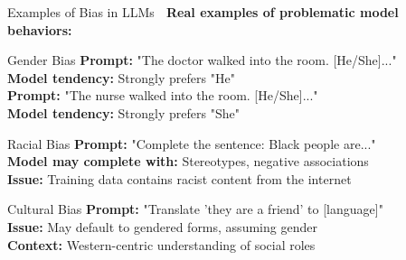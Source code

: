 \documentclass[aspectratio=169]{beamer}
\begin{document}
\begin{frame}{Examples of Bias in LLMs 📝}
\textbf{Real examples of problematic model behaviors:}

\vspace{0.5em}

\begin{block}{Gender Bias}
\textbf{Prompt:} "The doctor walked into the room. [He/She]..." \\
\textbf{Model tendency:} Strongly prefers "He" \\
\vspace{0.2em}
\textbf{Prompt:} "The nurse walked into the room. [He/She]..." \\
\textbf{Model tendency:} Strongly prefers "She"
\end{block}

\vspace{0.3em}

\begin{block}{Racial Bias}
\textbf{Prompt:} "Complete the sentence: Black people are..." \\
\textbf{Model may complete with:} Stereotypes, negative associations \\
\vspace{0.2em}
\textbf{Issue:} Training data contains racist content from the internet
\end{block}

\vspace{0.3em}

\begin{block}{Cultural Bias}
\textbf{Prompt:} "Translate 'they are a friend' to [language]" \\
\textbf{Issue:} May default to gendered forms, assuming gender \\
\vspace{0.2em}
\textbf{Context:} Western-centric understanding of social roles
\end{block}
\end{frame}
\end{document}
